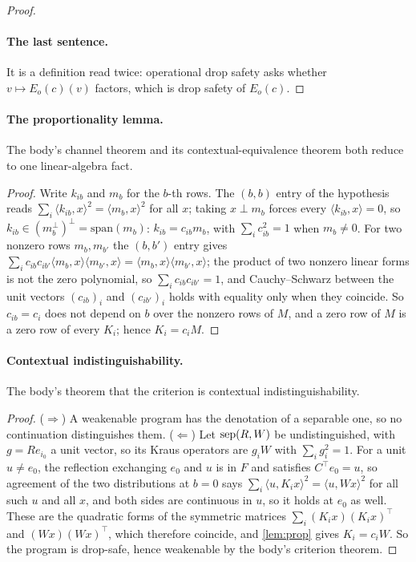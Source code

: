\documentclass[acmsmall,screen,review,anonymous,nonacm]{acmart}
\begin{document}
\begin{proof}
\paragraph{The last sentence.} It is a definition read twice: operational
drop safety asks whether $v \mapsto E_o(c)(v)$ factors, which is drop safety
of $E_o(c)$.
\end{proof}

\paragraph{The proportionality lemma.} The body's channel theorem and its
contextual-equivalence theorem both reduce to one linear-algebra fact.

\stmtProp
\begin{proof}
Write $k_{ib}$ and $m_b$ for the $b$-th rows. The $(b,b)$ entry of the
hypothesis reads $\sum_i \langle k_{ib}, x\rangle^{2} = \langle m_b,
x\rangle^{2}$ for all $x$; taking $x \perp m_b$ forces every $\langle k_{ib},
x\rangle = 0$, so $k_{ib} \in (m_b^{\perp})^{\perp} = \mathrm{span}(m_b)$:
$k_{ib} = c_{ib} m_b$, with $\sum_i c_{ib}^{2} = 1$ when $m_b \ne 0$. For two
nonzero rows $m_b, m_{b'}$ the $(b,b')$ entry gives $\sum_i c_{ib} c_{ib'}
\langle m_b, x\rangle \langle m_{b'}, x\rangle = \langle m_b, x\rangle
\langle m_{b'}, x\rangle$; the product of two nonzero linear forms is not the
zero polynomial, so $\sum_i c_{ib} c_{ib'} = 1$, and Cauchy--Schwarz between
the unit vectors $(c_{ib})_i$ and $(c_{ib'})_i$ holds with equality only when
they coincide. So $c_{ib} = c_i$ does not depend on $b$ over the nonzero rows
of $M$, and a zero row of $M$ is a zero row of every $K_i$; hence $K_i = c_i
M$.
\end{proof}

\paragraph{Contextual indistinguishability.} The body's theorem that the
criterion is contextual indistinguishability.

\stmtCtxEquiv
\begin{proof}
($\Rightarrow$) A weakenable program has the denotation of a separable one,
so no continuation distinguishes them. ($\Leftarrow$) Let $\mathrm{sep}(R,W)$ be
undistinguished, with $g = Re_{i_0}$ a unit vector, so its Kraus operators are
$g_i W$ with $\sum_i g_i^{2} = 1$. For a unit $u \ne e_0$, the reflection
exchanging $e_0$ and $u$ is in $F$ and satisfies $C^{\top}
e_0 = u$, so agreement of the two distributions at $b = 0$ says $\sum_i
\langle u, K_i x\rangle^{2} = \langle u, Wx\rangle^{2}$ for all such $u$ and
all $x$, and both sides are continuous in $u$, so it holds at $e_0$ as well. These are the quadratic forms of the symmetric matrices $\sum_i
(K_i x)(K_i x)^{\top}$ and $(Wx)(Wx)^{\top}$, which therefore coincide, and
\cref{lem:prop} gives $K_i = c_i W$. So the program is drop-safe, hence
weakenable by the body's criterion theorem.
\end{proof}
\end{document}
